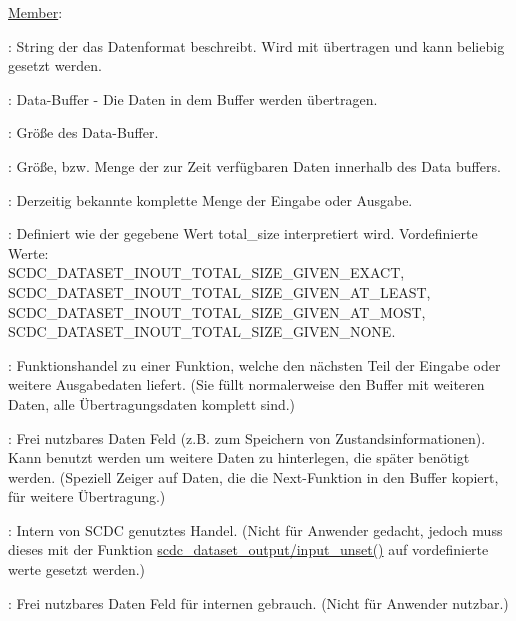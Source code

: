 {\begin{minipage}{\textwidth}
\underline{Member}:\\[1ex]
\small
\hspace*{2em}\begin{minipage}{0.8\textwidth}
\begin{description}
\setlength{\itemsep}{-3pt}
\item[- format]: String der das Datenformat beschreibt. Wird mit übertragen und kann beliebig gesetzt werden.
\item[- buf]: Data-Buffer - Die Daten in dem Buffer werden übertragen.
\item[- buf\_size]: Größe des Data-Buffer.
\item[- current\_size]: Größe, bzw. Menge der zur Zeit verfügbaren Daten innerhalb des Data buffers.
\item[- total\_size]: Derzeitig bekannte komplette Menge der Eingabe oder Ausgabe.
\item[- total\_size\_given]: Definiert wie der gegebene Wert total\_size interpretiert wird. Vordefinierte Werte:\\
                              SCDC\_DATASET\_INOUT\_TOTAL\_SIZE\_GIVEN\_EXACT,\\
                              SCDC\_DATASET\_INOUT\_TOTAL\_SIZE\_GIVEN\_AT\_LEAST,\\ 
                              SCDC\_DATASET\_INOUT\_TOTAL\_SIZE\_GIVEN\_AT\_MOST,\\
                              SCDC\_DATASET\_INOUT\_TOTAL\_SIZE\_GIVEN\_NONE.
\item[- next]: Funktionshandel zu einer Funktion, welche den nächsten Teil der Eingabe oder weitere Ausgabedaten liefert. (Sie füllt normalerweise den Buffer mit weiteren Daten, alle Übertragungsdaten komplett sind.)
\item[- data]: Frei nutzbares Daten Feld (z.B. zum Speichern von Zustandsinformationen). Kann benutzt werden um weitere Daten zu hinterlegen, die später benötigt werden. (Speziell Zeiger auf Daten, die die Next-Funktion in den Buffer kopiert, für weitere Übertragung.)
\item[- intern]: Intern von SCDC genutztes Handel. (Nicht für Anwender gedacht, jedoch muss dieses mit der Funktion \hyperref[scdc_dataset_inout_unset]{scdc\_dataset\_output/input\_unset()} auf vordefinierte werte gesetzt werden.)
\item[-  intern\_data]: Frei nutzbares Daten Feld für internen gebrauch.  (Nicht für Anwender nutzbar.)
\end{description}
\end{minipage}
\end{minipage}}

